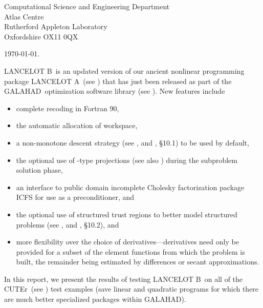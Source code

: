 \documentclass[11pt,twoside]{article}
\newcommand{\gal}{{\sf GALAHAD}}
\newcommand{\lana}{{\sf LANCELOT A}}
\newcommand{\lanb}{{\sf LANCELOT B}}
\newcommand{\cuter}{{\sf CUTEr}}
\begin{document}
\begin{titlepage}
\vspace{0.6 cm}

\noindent
Computational Science and Engineering Department
\\
Atlas Centre
\\
Rutherford Appleton Laboratory
\\
Oxfordshire OX11 0QX

\vspace{0.1 cm}
\noindent \today .

\end{titlepage}




\setcounter{page}{1}

\lanb\ is an updated version of our ancient nonlinear programming
package \lana\ (see ) that has just been
released as part of the \gal\ optimization software library (see
). New features include
\begin{itemize}
\item complete recoding in Fortran 90,
\item the automatic allocation of workspace,
\item a non-monotone descent strategy (see , and
, \S10.1) to be used by default,
\item the optional use of -type projections
   (see also )
   during the subproblem solution phase,
\item an interface to  public domain incomplete Cholesky
   factorization package ICFS for use as a preconditioner, and
\item the optional use of structured trust regions to better model
   structured problems (see , and
   , \S10.2), and
\item more flexibility over the choice of derivatives---derivatives need
   only be provided for a subset of the element functions from which the
   problem is built, the remainder being estimated by differences or secant
   approximations.
\end{itemize}
In this report, we present the results of testing \lanb\ on all of the
\cuter\ (see ) test examples (save linear and
quadratic programs for which there are much better specialized
packages within \gal).
\end{document}
